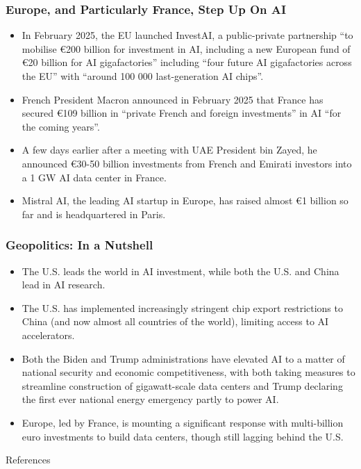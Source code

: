 \documentclass[aspectratio=169]{beamer}
\begin{document}
    \begin{frame}
        \frametitle{Europe, and Particularly France, Step Up On AI}
        \begin{itemize}
            \item In February 2025, the EU launched InvestAI, a public-private partnership ``to mobilise €200 billion for investment in AI, including a new European fund of €20 billion for AI gigafactories'' including ``four future AI gigafactories across the EU'' with ``around 100 000 last-generation AI chips''.~\parencite{european_commission_2025}
            \item French President Macron announced in February 2025 that France has secured €109 billion in ``private French and foreign investments'' in AI ``for the coming years''.~\parencite{le_monde_intelligence_2025}
            \item A few days earlier after a meeting with UAE President bin Zayed, he announced €30-50 billion investments from French and Emirati investors into a 1 GW AI data center in France.~\parencite{data_center_dynamics_france_2025}
            \item Mistral AI, the leading AI startup in Europe, has raised almost €1 billion so far and is headquartered in Paris.
        \end{itemize}
    \end{frame}
    \begin{frame}
        \frametitle{Geopolitics: In a Nutshell}
        \begin{itemize}
            \item The U.S. leads the world in AI investment, while both the U.S. and China lead in AI research.
            \item The U.S. has implemented increasingly stringent chip export restrictions to China (and now almost all countries of the world), limiting access to AI accelerators.
            \item Both the Biden and Trump administrations have elevated AI to a matter of national security and economic competitiveness, with both taking measures to streamline construction of gigawatt-scale data centers and Trump declaring the first ever national energy emergency partly to power AI.
            \item Europe, led by France, is mounting a significant response with multi-billion euro investments to build data centers, though still lagging behind the U.S.
        \end{itemize}
    \end{frame}
    
    \begin{frame}[allowframebreaks]{References}
        \printbibliography
    \end{frame}
\end{document}
